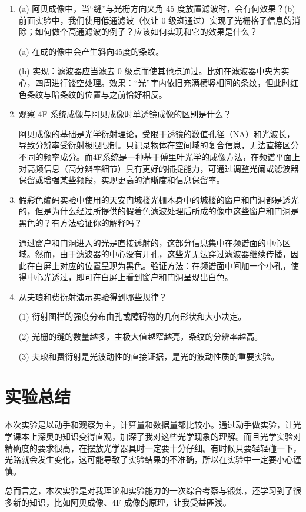 \documentclass[11pt]{article}
\begin{document}
\begin{enumerate}
    \item (a) 阿贝成像中，当“缝”与光栅方向夹角 45 度放置滤波时，会有何效果？(b) 前面实验中，我们使用低通滤波（仅让 0 级斑通过）实现了光栅格子信息的消除；如何做个高通滤波的例子？应该如何实现和它的效果是什么？
    
    (a) 在成的像中会产生斜向45度的条纹。

    (b) 实现：滤波器应当滤去 0 级点而使其他点通过。比如在滤波器中央为实心，四周进行镂空处理。效果：“光”字内依旧充满横竖相间的条纹，但此时红色条纹与暗条纹的位置与之前恰好相反。

    \item 观察 4F 系统成像与阿贝成像时单透镜成像的区别是什么？
    
    阿贝成像的基础是光学衍射理论，受限于透镜的数值孔径（NA）和光波长，导致分辨率受衍射极限限制。只记录物体在空间域的复合信息，无法直接区分不同的频率成分。而4F系统是一种基于傅里叶光学的成像方法，在频谱平面上对高频信息（高分辨率细节）具有更好的捕捉能力，可通过调整光阑或滤波器保留或增强某些频段，实现更高的清晰度和信息保留率。

    \item 假彩色编码实验中使用的天安门城楼光栅本身中的城楼的窗户和门洞都是透光的，但是为什么经过所提供的假着色滤波处理后所成的像中这些窗户和门洞是黑色的？有方法验证你的解释吗？
    
    通过窗户和门洞进入的光是直接透射的，这部分信息集中在频谱面的中心区域。然而，由于滤波器的中心没有开孔，这些光无法穿过滤波器继续传播，因此在白屏上对应的位置呈现为黑色。验证方法：在频谱面中间加一个小孔，使得中心光透过，即可在白屏上看到窗户和门洞呈现出白色。

    \item 从夫琅和费衍射演示实验得到哪些规律？ 
    
    (1) 衍射图样的强度分布由孔或障碍物的几何形状和大小决定。

    (2) 光栅的缝的数量越多，主极大值越窄越亮，条纹的分辨率越高。

    (3) 夫琅和费衍射是光波动性的直接证据，是光的波动性质的重要实验。

\end{enumerate}

\section{实验总结}

本次实验是以动手和观察为主，计算量和数据量都比较小。通过动手做实验，让光学课本上深奥的知识变得直观，加深了我对这些光学现象的理解。而且光学实验对精确度的要求很高，在摆放光学器具时一定要十分仔细。有时候只要轻轻碰一下，光路就会发生变化，这可能导致了实验结果的不准确，所以在实验中一定要小心谨慎。

总而言之，本次实验是对我理论和实验能力的一次综合考察与锻炼，还学习到了很多新的知识，比如阿贝成像、4F 成像的原理，让我受益匪浅。
\end{document}
